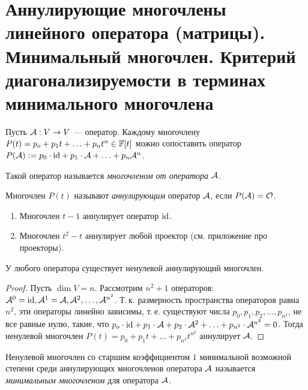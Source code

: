 \section{Аннулирующие многочлены линейного оператора (матрицы). Минимальный многочлен. Критерий диагонализируемости в терминах минимального многочлена}

Пусть $\mathcal{A}: V \to V$ --- оператор. Каждому многочлену $P(t) = p_o + p_1t + \ldots + p_nt^n \in \mathbb{F}[t]$ можно сопоставить оператор $P(\mathcal{A}) \vcentcolon = p_0 \cdot \mathrm{id} + p_1 \cdot \mathcal{A} + \ldots + p_n\mathcal{A}^n$.

\begin{definition}
    Такой оператор называется \textit{многочленом от оператора} $\mathcal{A}$.
\end{definition}

\begin{definition}
    Многочлен $P(t)$ называют \textit{аннулирующим} оператор $\mathcal{A}$, если $P(\mathcal{A}) = \mathcal{O}$.
\end{definition}

\begin{example}
    \begin{enumerate}[nolistsep]
        \item Многочлен $t - 1$ аннулирует оператор $\mathrm{id}$.
        \item Многочлен $t^2 - t$ аннулирует любой проектор (см. приложение про проекторы).
    \end{enumerate}
\end{example}

\begin{proposal}
    У любого оператора существует ненулевой аннулирующий многочлен.
\end{proposal}

\begin{proof}
    Пусть $\dim V = n$. Рассмотрим $n^2 + 1$ операторов: $\mathcal{A}^0 = \mathrm{id}, \mathcal{A}^1 = \mathcal{A}, \mathcal{A}^2, \ldots, \mathcal{A}^{n^2}$. Т.\,к. размерность пространства операторов равна $n^2$, эти операторы линейно зависимы, т.\,е. существуют числа $p_0, p_1, p_2, \ldots, p_{n^2}$, не все равные нулю, такие, что $p_o \cdot \mathrm{id} + p_1 \cdot \mathcal{A} + p_2 \cdot \mathcal{A}^2 + \ldots + p_{n^2} \cdot \mathcal{A}^{n^2} = 0$. Тогда ненулевой многочлен $P(t) = p_0 + p_1t + \ldots + p_{n^2}t^{n^2}$ аннулирует $\mathcal{A}$.
\end{proof}

\begin{definition}
    Ненулевой многочлен со старшим коэффициентом $1$ минимальной возможной степени среди аннулирующих многочленов оператора $\mathcal{A}$ называется \textit{минимальным многочленом} для оператора $\mathcal{A}$.
\end{definition}

